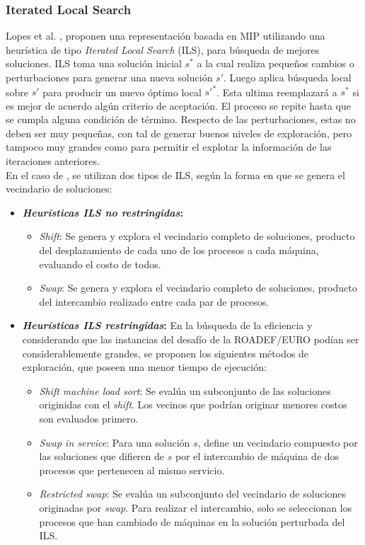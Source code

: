 \subsubsection{Iterated Local Search}
Lopes et al. \cite{lopes2015heuristics}, proponen una representación basada en MIP utilizando una heurística de tipo \textit{Iterated Local Search} (ILS), para búsqueda de mejores soluciones. ILS toma una solución inicial $s^{*}$ a la cual realiza pequeños cambios o perturbaciones para generar una nueva solución $s'$. Luego aplica búsqueda local sobre $s'$ para producir un nuevo óptimo local ${s'}^{*}$. Esta ultima reemplazará a $s^{*}$  si es mejor de acuerdo algún criterio de aceptación. El proceso se repite hasta que se cumpla alguna condición de término. Respecto de las perturbaciones, estas no deben ser muy pequeñas, con tal de generar buenos niveles de exploración, pero tampoco muy grandes como para permitir el explotar la información de las iteraciones anteriores. \\
En el caso de \cite{lopes2015heuristics}, se utilizan dos tipos de ILS, según la forma en que se genera el vecindario de soluciones:
\begin{itemize}
	\item \textbf{\textit{Heurísticas ILS no restringidas}:}
		\begin{itemize}
			\item \textit{Shift}: Se genera y explora el vecindario completo de soluciones, producto del desplazamiento de cada uno de los procesos a cada máquina, evaluando el costo de todos. 
			\item \textit{Swap}: Se genera y explora el vecindario completo de soluciones, producto del intercambio realizado entre cada par de procesos. 			
		\end{itemize}
	\item \textbf{\textit{Heurísticas ILS restringidas}:} En la búsqueda de la eficiencia y considerando que las instancias del desafío de la ROADEF/EURO podían ser considerablemente grandes, se proponen los siguientes métodos de exploración, que poseen una menor tiempo de ejecución:
		\begin{itemize}
			\item \textit{Shift machine load sort}: Se evalúa un subconjunto de las soluciones originidas con el \emph{shift}. Los vecinos que podrían originar menores costos son evaluados primero.
			\item \textit{Swap in service}:	Para una solución $s$, define un vecindario compuesto por las soluciones que difieren de $s$ por el intercambio de máquina de dos procesos que pertenecen al mismo servicio. 
			\item \textit{Restricted swap}: Se evalúa un subconjunto del vecindario de soluciones originadas por \emph{swap}. Para realizar el intercambio, solo se seleccionan los procesos que han cambiado de máquinas en la solución perturbada del ILS.		
		\end{itemize}
\end{itemize}
